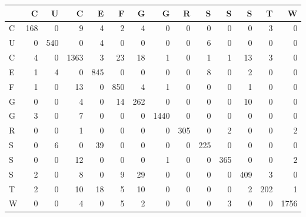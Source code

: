 \begin{tabular}{lrrrrrrrrrrrrr}
\toprule
{} &    C &    U &     C &    E &    F &    G &     G &    R &    S &    S &    S &    T &     W \\
\midrule
C &  168 &    0 &     9 &    4 &    2 &    4 &     0 &    0 &    0 &    0 &    0 &    3 &     0 \\
U &    0 &  540 &     0 &    4 &    0 &    0 &     0 &    0 &    6 &    0 &    0 &    0 &     0 \\
C &    4 &    0 &  1363 &    3 &   23 &   18 &     1 &    0 &    1 &    1 &   13 &    3 &     0 \\
E &    1 &    4 &     0 &  845 &    0 &    0 &     0 &    0 &    8 &    0 &    2 &    0 &     0 \\
F &    1 &    0 &    13 &    0 &  850 &    4 &     1 &    0 &    0 &    0 &    1 &    0 &     0 \\
G &    0 &    0 &     4 &    0 &   14 &  262 &     0 &    0 &    0 &    0 &   10 &    0 &     0 \\
G &    3 &    0 &     7 &    0 &    0 &    0 &  1440 &    0 &    0 &    0 &    0 &    0 &     0 \\
R &    0 &    0 &     1 &    0 &    0 &    0 &     0 &  305 &    0 &    2 &    0 &    0 &     2 \\
S &    0 &    6 &     0 &   39 &    0 &    0 &     0 &    0 &  225 &    0 &    0 &    0 &     0 \\
S &    0 &    0 &    12 &    0 &    0 &    0 &     1 &    0 &    0 &  365 &    0 &    0 &     2 \\
S &    2 &    0 &     8 &    0 &    9 &   29 &     0 &    0 &    0 &    0 &  409 &    3 &     0 \\
T &    2 &    0 &    10 &   18 &    5 &   10 &     0 &    0 &    0 &    0 &    2 &  202 &     1 \\
W &    0 &    0 &     4 &    0 &    5 &    2 &     0 &    0 &    0 &    3 &    0 &    0 &  1756 \\
\bottomrule
\end{tabular}
